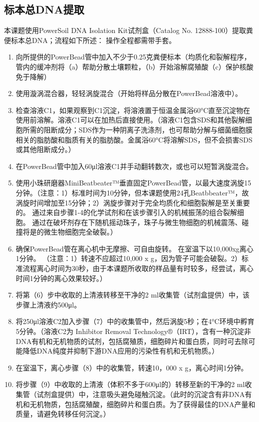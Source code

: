   \subsection{标本总DNA提取}
  \label{标本总DNA提取}
  本课题使用PowerSoil\textsuperscript{\textregistered} DNA Isolation Kit试剂盒（Catalog No. 12888-100）提取粪便标本总DNA；流程如下所述：
  操作全程都需带手套。
    \begin{enumerate}
      \item 向所提供的PowerBead管中加入不少于0.25克粪便标本（均质化和裂解程序，管内的缓冲剂将（a）帮助分散土壤颗粒，（b）开始溶解腐殖酸（c）保护核酸免于降解）
      \item 使用漩涡混合器，轻轻涡旋混合（开始将样品分散在PowerBead溶液中）。
      \item 检查溶液C1，如果观察到C1沉淀，将溶液置于恒温金属浴60°C直至沉淀物在使用前溶解。溶液C1可以在加热后直接使用。（溶液C1包含SDS和其他裂解细胞所需的阻断成分；SDS作为一种阴离子洗涤剂，也可帮助分解与细菌细胞膜相关的脂肪酸和脂质有关的脂肪酸。金属浴60°C将溶解SDS，但不会损害SDS或其他阻断成分。）
      \item 在PowerBead管中加入60μl溶液C1并手动翻转数次，或也可以短暂涡旋混合。
      \item 使用小珠研磨器MiniBeatbeater™垂直固定PowerBead管，以最大速度涡旋15分钟。（注意：1）标准时间为10分钟，但本课题使用24孔Beatbbeater™，故涡旋时间增加至15分钟；2）涡旋步骤对于完全均质化和细胞裂解是至关重要的。 通过来自步骤1-4的化学试剂和在该步骤引入的机械振荡的组合裂解细胞。 通过在破坏剂存在下随机摇动珠子，珠子与微生物细胞的机械震荡、碰撞将是的微生物细胞完全破裂。）
      \item 确保PowerBead管在离心机中无摩擦、可自由旋转。 在室温下以10,000xg离心1分钟。 （注意：1）转速不应超过10,000 x g，因为管子可能会破裂。2）标准流程离心时间为30秒，由于本课题所收取的样品量有时较多，经尝试，离心时间1分钟的离心效果较好。）
      \item 将第（6）步中收取的上清液转移至干净的2 ml收集管（试剂盒提供）中，该步骤上清液约500μl。
      \item 将250μl溶液C2加入步骤（7）中的收集管中，然后涡旋5秒；在4°C环境中孵育5分钟。（溶液C2为 Inhibitor Removal Technology®（IRT），含有一种沉淀非DNA有机和无机物质的试剂，包括腐殖质，细胞碎片和蛋白质，同时可去除可能降低DNA纯度并抑制下游DNA应用的污染性有机和无机物质。）
      \item 在室温下，离心步骤（8）中的收集管，转速10，000 x g，离心时间1分钟。
      \item 将步骤（9）中收取的上清液（体积不多于600μl的）转移至新的干净的2 ml收集管（试剂盒提供）中，注意吸头避免碰触沉淀。（此时的沉淀含有非DNA有机和无机物质，包括腐殖酸，细胞碎片和蛋白质。为了获得最佳的DNA产量和质量，请避免转移任何沉淀。）

\end{enumerate}
